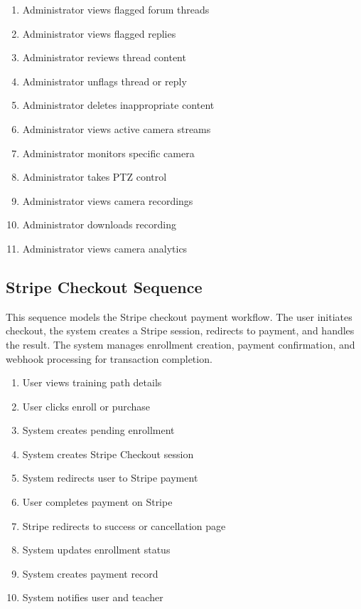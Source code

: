 \begin{enumerate}[topsep=0pt,itemsep=1pt,parsep=0pt,partopsep=0pt]
    \item Administrator views flagged forum threads
    \item Administrator views flagged replies
    \item Administrator reviews thread content
    \item Administrator unflags thread or reply
    \item Administrator deletes inappropriate content
    \item Administrator views active camera streams
    \item Administrator monitors specific camera
    \item Administrator takes PTZ control
    \item Administrator views camera recordings
    \item Administrator downloads recording
    \item Administrator views camera analytics
\end{enumerate}


\subsection{Stripe Checkout Sequence}
This sequence models the Stripe checkout payment workflow. The user initiates
checkout, the system creates a Stripe session, redirects to payment, and
handles the result. The system manages enrollment creation, payment
confirmation, and webhook processing for transaction completion.

\begin{enumerate}[topsep=0pt,itemsep=1pt,parsep=0pt,partopsep=0pt]
    \item User views training path details
    \item User clicks enroll or purchase
    \item System creates pending enrollment
    \item System creates Stripe Checkout session
    \item System redirects user to Stripe payment
    \item User completes payment on Stripe
    \item Stripe redirects to success or cancellation page
    \item System updates enrollment status
    \item System creates payment record
    \item System notifies user and teacher
\end{enumerate}

